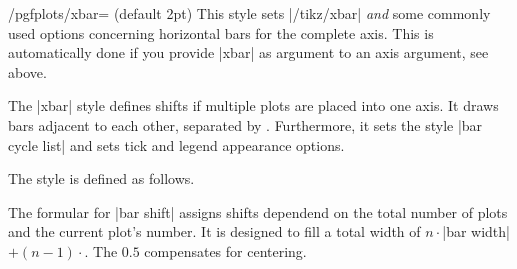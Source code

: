 \begin{stylekey}{/pgfplots/xbar= (default 2pt)}
	This style sets |/tikz/xbar| \emph{and} some commonly used options concerning horizontal bars for the complete axis. This is automatically done if you provide |xbar| as argument to an axis argument, see above.

The |xbar| style defines shifts if multiple plots are placed into one axis. It draws bars adjacent to each other, separated by . Furthermore, it sets the style |bar cycle list| and sets tick and legend appearance options.

The style is defined as follows.
The formular for |bar shift| assigns shifts dependend on the total number of plots and the current plot's number. It is designed to fill a total width of $n \cdot $|bar width|$ + (n-1) \cdot $. The $0.5$ compensates for centering.
\end{stylekey}

